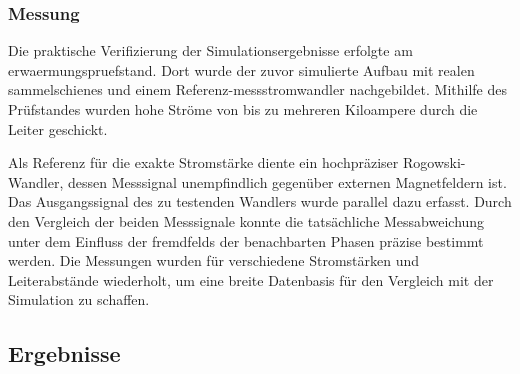 \subsubsection{Messung}
\label{sec:vorgehen:messung}
Die praktische Verifizierung der Simulationsergebnisse erfolgte am \gls{erwaermungspruefstand}. Dort wurde der zuvor simulierte Aufbau mit realen \glspl{sammelschiene} und einem Referenz-\gls{messstromwandler} nachgebildet. Mithilfe des Prüfstandes wurden hohe Ströme von bis zu mehreren Kiloampere durch die Leiter geschickt.

Als Referenz für die exakte Stromstärke diente ein hochpräziser Rogowski-Wandler, dessen Messsignal unempfindlich gegenüber externen Magnetfeldern ist. Das Ausgangssignal des zu testenden Wandlers wurde parallel dazu erfasst. Durch den Vergleich der beiden Messsignale konnte die tatsächliche Messabweichung unter dem Einfluss der \glspl{fremdfeld} der benachbarten Phasen präzise bestimmt werden. Die Messungen wurden für verschiedene Stromstärken und Leiterabstände wiederholt, um eine breite Datenbasis für den Vergleich mit der Simulation zu schaffen.


\subsection{Ergebnisse}
\label{sec:ergebnisse}
